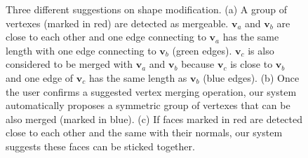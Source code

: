 \begin{figure}
	\centering
	 \hfill
	 \hfill
	 
	 \caption{Three different suggestions on shape modification. (a) A group of vertexes (marked in red) are detected as mergeable. $\mathbf{v}_a$ and $\mathbf{v}_b$ are close to each other and one edge connecting to $\mathbf{v}_a$ has the same length with one edge connecting to $\mathbf{v}_b$ (green edges). $\mathbf{v}_c$ is also considered to be merged with $\mathbf{v}_a$ and $\mathbf{v}_b$ because $\mathbf{v}_c$ is close to $\mathbf{v}_b$ and one edge of $\mathbf{v}_c$ has the same length as $\mathbf{v}_b$ (blue edges). (b) Once the user confirms a suggested vertex merging operation, our system automatically proposes a symmetric group of vertexes that can be also merged (marked in blue). (c) If faces marked in red are detected close to each other and the same with their normals, our system suggests these faces can be sticked together.}
	 \label{fig:suggestion}
\end{figure}

